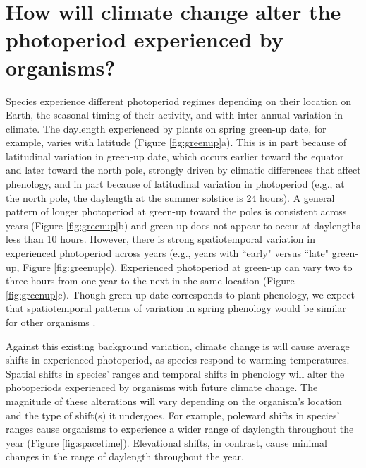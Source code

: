 \documentclass{article}
\begin{document}
\section*{How will climate change alter the photoperiod experienced by organisms?}
\par Species experience different photoperiod regimes depending on their location on Earth, the seasonal timing of their activity, and with inter-annual variation in climate. The daylength experienced by plants on spring green-up date, for example, varies with latitude (Figure \ref{fig:greenup}a). This is in part because of latitudinal variation in green-up date, which occurs earlier toward the equator and later toward the north pole, strongly driven by climatic differences that affect phenology, and in part because of latitudinal variation in photoperiod (e.g., at the north pole, the daylength at the summer solstice is 24 hours). A general pattern of longer photoperiod at green-up toward the poles is consistent across years (Figure \ref{fig:greenup}b) and green-up does not appear to occur at daylengths less than 10 hours. However, there is strong spatiotemporal variation in experienced photoperiod across years (e.g., years with ``early" versus ``late" green-up, Figure \ref{fig:greenup}c). Experienced photoperiod at green-up can vary two to three hours from one year to the next in the same location (Figure \ref{fig:greenup}c). Though green-up date corresponds to plant phenology, we expect that spatiotemporal patterns of variation in spring phenology would be similar for other organisms \citep{ovaskainen2013, penuelas2002}.

\par Against this existing background variation, climate change is will cause average shifts in experienced photoperiod, as species respond to warming temperatures. Spatial shifts in species' ranges and temporal shifts in phenology will alter the photoperiods experienced by organisms with future climate change. The magnitude of these alterations will vary depending on the organism's location and the type of shift(s) it undergoes. For example, poleward shifts in species' ranges cause organisms to experience a wider range of daylength throughout the year (Figure \ref{fig:spacetime}). Elevational shifts, in contrast, cause minimal changes in the range of daylength throughout the year. %
\end{document}
